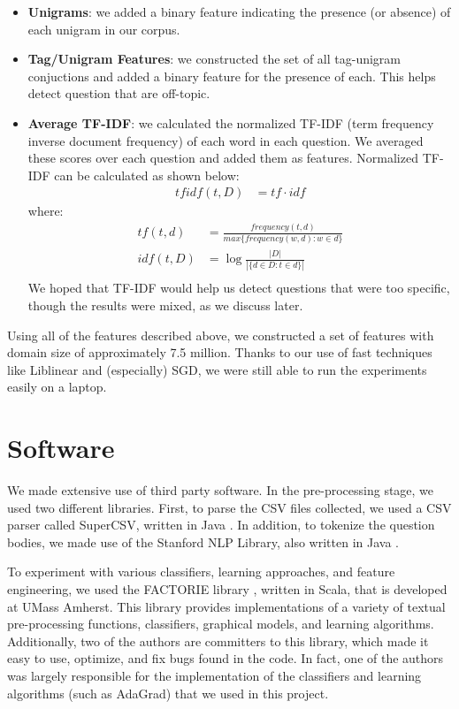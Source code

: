 \documentclass[11pt]{article}
\begin{document}
\begin{itemize}
  \item \textbf{Unigrams}: we added a binary feature indicating the
    presence (or absence) of each unigram in our corpus.
  \item \textbf{Tag/Unigram Features}: we constructed the set of all
    tag-unigram conjuctions and added a binary feature for the
    presence of each.  This helps detect question that are off-topic.
  \item \textbf{Average TF-IDF}: we calculated the normalized TF-IDF
    \cite{wiki:tfidf} (term frequency inverse document frequency) of
    each word in each question. We averaged these scores over each
    question and added them as features. Normalized TF-IDF can be
    calculated as shown below:
    \begin{align*}
            tfidf(t,D) &= tf \cdot idf
    \end{align*}
    where:
    \begin{align*}
      tf(t,d) &= \frac{frequency(t,d)}{max\{frequency(w,d):w \in d\}}\\
      idf(t,D) &= \log\frac{|D|}{|\{d \in D : t \in d \}|}\\
    \end{align*}
    We hoped that TF-IDF would help us detect questions that were too specific, though the results were mixed, as we discuss later. 
\end{itemize}
Using all of the features described above, we constructed a set of
features with domain size of approximately 7.5 million. Thanks to our use of fast techniques like Liblinear and (especially) SGD, we were still able to run the experiments easily on a laptop.

\section{Software}

We made extensive use of third party software. In the pre-processing stage, we
used two different libraries.  First, to parse the CSV files
collected, we used a CSV parser called SuperCSV, written in Java
\cite{website:supercsv}. In addition, to tokenize the question bodies,
we made use of the Stanford NLP Library, also written in Java
\cite{stanfordnlp}.

To experiment with various classifiers, learning approaches, and
feature engineering, we used the FACTORIE library
\cite{mccallum09:factorie:}, written in Scala, that is developed at
UMass Amherst.  This library provides implementations of a variety of
textual pre-processing functions, classifiers, graphical models, and
learning algorithms. Additionally, two of the authors are committers
to this library, which made it easy to use, optimize, and fix bugs
found in the code. In fact, one of the authors was largely responsible
for the implementation of the classifiers and learning algorithms
(such as AdaGrad) that we used in this project.
\end{document}

